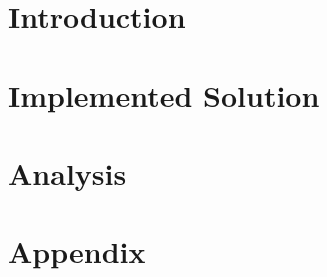 \documentclass[11pt,a4paper]{report}
\begin{document}
\newtheorem{defn}{Definition}

\setlength{\parindent}{0pt}





\tableofcontents

\setlength{\parskip}{6pt}




\part{Introduction}










\part{Implemented Solution}










\part{Analysis}










\appendix

\part{Appendix}











\listoftables

\listoffigures
\end{document}
